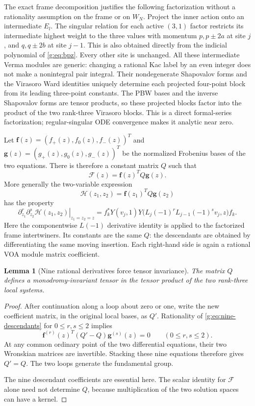 \documentclass[11pt,a4paper]{article}
\numberwithin{equation}{section}
\newtheorem{lemma}[theorem]{Lemma}
\theoremstyle{definition}\newtheorem{definition}[theorem]{Definition}
\theoremstyle{remark}\newtheorem{remark}[theorem]{Remark}
\begin{document}
The exact frame decomposition justifies the following factorization
without a rationality assumption on the frame or on $W_N$. Project
the inner action onto an intermediate $E_l$. The singular relation
for each active $(3,1)$ factor restricts its intermediate highest
weight to the three values with momentum $p,p\pm2a$ at site $j$,
and $q,q\pm2b$ at site $j-1$. This is also obtained directly from
the indicial polynomial of \eqref{g:eq:bpz}. Every other site is unchanged.
All these intermediate Verma modules are generic: changing a rational
Kac label by an even integer does not make a nonintegral pair integral.
Their nondegenerate Shapovalov forms and the Virasoro Ward identities
uniquely determine each projected four-point block from its leading
three-point constants. The PBW bases and the inverse Shapovalov forms
are tensor products, so these projected blocks factor into the product
of the two rank-three Virasoro blocks. This is a direct formal-series
factorization; regular-singular ODE convergence makes it analytic
near zero.

Let $\boldsymbol f(z)=(f_+(z),f_0(z),f_-(z))^T$ and
$\boldsymbol g(z)=(g_+(z),g_0(z),g_-(z))^T$ be the normalized
Frobenius bases of the two equations. There is therefore a constant
matrix $Q$ such that
\[
 \mathcal F(z)=\boldsymbol f(z)^TQ\boldsymbol g(z).
\]
More generally the two-variable expression
\[
 \mathcal H(z_1,z_2)=\boldsymbol f(z_1)^TQ\boldsymbol g(z_2)
\]
has the property
\begin{equation}
 \left.\partial_{z_1}^r\partial_{z_2}^s
          \mathcal H(z_1,z_2)\right|_{z_1=z_2=z}
 =f_k^*Y(v_j,1)
    Y\bigl(L_j(-1)^rL_{j-1}(-1)^sv_j,z\bigr)f_k.
 \label{g:eq:nine-descendants}
\end{equation}
Here the componentwise $L(-1)$ derivative identity is applied to
the factorized frame intertwiners. Its constants are the same $Q$:
the descendants are obtained by differentiating the same moving
insertion. Each right-hand side is again a rational VOA module
matrix coefficient.

\begin{lemma}[Nine rational derivatives force tensor invariance]
\label{g:lem:nine-jets}
The matrix $Q$ defines a monodromy-invariant tensor in the tensor
product of the two rank-three local systems.
\end{lemma}
\begin{proof}
After continuation along a loop about zero or one, write the new
coefficient matrix, in the original local bases, as $Q'$. Rationality
of \eqref{g:eq:nine-descendants} for $0\le r,s\le2$ implies
\[
 \boldsymbol f^{(r)}(z)^T(Q'-Q)\boldsymbol g^{(s)}(z)=0
 \qquad(0\le r,s\le2).
\]
At any common ordinary point of the two differential equations, their
two Wronskian matrices are invertible. Stacking these nine equations
therefore gives $Q'=Q$. The two loops generate the fundamental group.

The nine descendant coefficients are essential here.  The scalar
identity for $\mathcal F$ alone need not determine $Q$, because
multiplication of the two solution spaces can have a kernel.
\end{proof}
\end{document}
